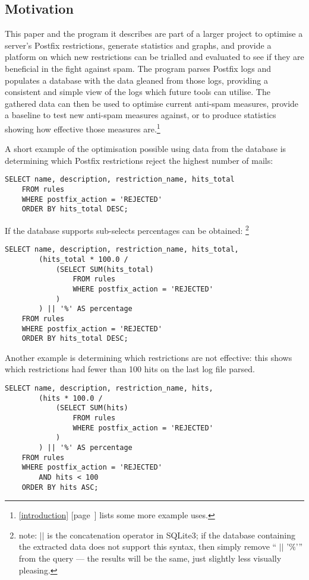 \documentclass[a4paper,12pt,draft]{article}
\newcommand{\refwithpage}[1]{%
    \empty{}\ref{#1} [page~\pageref{#1}]%
}
\newcommand{\sectionref}[1]{%
    \textsection{}\refwithpage{#1}%
}
\begin{document}
\subsection{Motivation}

This paper and the program it describes are part of a larger project to
optimise a server's Postfix restrictions, generate statistics and graphs,
and provide a platform on which new restrictions can be trialled and
evaluated to see if they are beneficial in the fight against spam.  The
program parses Postfix logs and populates a database with the data gleaned
from those logs, providing a consistent and simple view of the logs which
future tools can utilise.  The gathered data can then be used to optimise
current anti-spam measures, provide a baseline to test new anti-spam
measures against, or to produce statistics showing how effective those
measures are.\footnote{\sectionref{introduction} lists some more example
uses.}

A short example of the optimisation possible using data from the database
is determining which Postfix restrictions reject the highest number of
mails:

\begin{verbatim}
SELECT name, description, restriction_name, hits_total
    FROM rules
    WHERE postfix_action = 'REJECTED'
    ORDER BY hits_total DESC;
\end{verbatim}

If the database supports sub-selects percentages can be obtained:
\footnote{\SQL{} note: $||$ is the concatenation operator in SQLite3; if
the database containing the extracted data does not support this syntax,
then simply remove `` $||$ '$\%$'\hspace{1ex}'' from the query --- the
results will be the same, just slightly less visually pleasing.}

\begin{verbatim}
SELECT name, description, restriction_name, hits_total,
        (hits_total * 100.0 /
            (SELECT SUM(hits_total)
                FROM rules
                WHERE postfix_action = 'REJECTED'
            )
        ) || '%' AS percentage
    FROM rules
    WHERE postfix_action = 'REJECTED'
    ORDER BY hits_total DESC;
\end{verbatim}

Another example is determining which restrictions are not effective: this
shows which restrictions had fewer than 100 hits on the last log file
parsed.

\begin{verbatim}
SELECT name, description, restriction_name, hits,
        (hits * 100.0 /
            (SELECT SUM(hits)
                FROM rules
                WHERE postfix_action = 'REJECTED'
            )
        ) || '%' AS percentage
    FROM rules
    WHERE postfix_action = 'REJECTED'
        AND hits < 100
    ORDER BY hits ASC;
\end{verbatim}
\end{document}
